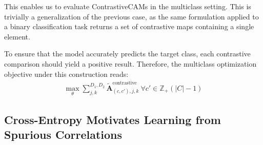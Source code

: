 \documentclass{article}
\theoremstyle{plain}
\theoremstyle{definition}
\theoremstyle{remark}
\begin{document}
This enables us to evaluate ContrastiveCAMs in the multiclass setting. This is trivially a generalization of the previous case, as the same formulation applied to a binary classification task returns a set of contrastive maps containing a single element.

To ensure that the model accurately predicts the target class, each contrastive comparison should yield a positive result. Therefore, the multiclass optimization objective under this construction reads:
\begin{gather}
	\max_{\theta} \sum^{D_1,D_2}_{j,k}\tilde{\mathcal{\bm{A}}}_{(c, c'),j,k}^{\text{contrastive}}\ \forall c' \in \mathbb{Z}_{+}(|C| - 1)
\end{gather}

\subsection{Cross-Entropy Motivates Learning from Spurious Correlations} \label{ce-motiv-spurious}
\end{document}
